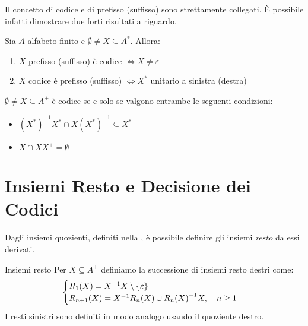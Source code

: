 Il concetto di codice e di prefisso (suffisso) sono strettamente collegati.
È possibile infatti dimostrare due forti risultati a riguardo.
\begin{theorem}{}
  Sia \(A\) alfabeto finito e \(\emptyset \neq X \subseteq A^*\).
  Allora:
  \begin{enumerate}
    \item \(X\) prefisso (suffisso) è codice \(\iff X \neq {\varepsilon}\)
    \item \(X\) codice è prefisso (suffisso) \(\iff X^*\) unitario a sinistra (destra)
  \end{enumerate}
\end{theorem}

\begin{corollary}{}
  \(\emptyset \neq X \subseteq A^+\) è codice se e solo se valgono entrambe le seguenti condizioni:
  \begin{itemize}
    \item \({(X^*)}^{-1}X^* \cap X{(X^*)}^{-1} \subseteq X^* \)
    \item \(X \cap XX^+ = \emptyset\)
  \end{itemize}
\end{corollary}

\section{Insiemi Resto e Decisione dei Codici}

Dagli insiemi quozienti, definiti nella , è possibile definire gli insiemi \emph{resto} da essi derivati.
\begin{definition}{Insiemi resto}
  Per \(X \subseteq A^+\) definiamo la successione di insiemi resto destri come:
  \begin{equation}
    \begin{cases}
      R_1(X) = X^{-1}X\setminus \set{\varepsilon} \\
      R_{n+1}(X) =X^{-1} R_n(X) \cup {R_n(X)}^{-1}X, \quad n \geq 1\\
    \end{cases}
  \end{equation}
  I resti sinistri sono definiti in modo analogo usando il quoziente destro.
\end{definition}

